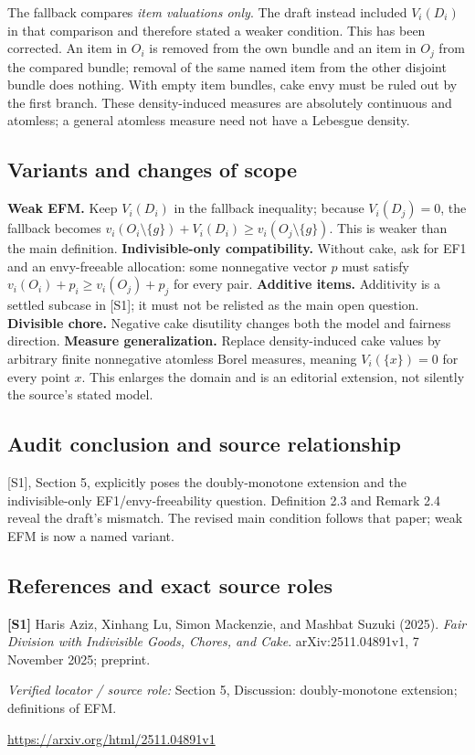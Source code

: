 \documentclass[11pt,a4paper]{article}
\begin{document}
The fallback compares \emph{item valuations only}. The draft instead included $V_i(D_i)$ in that comparison and therefore stated a weaker condition. This has been corrected. An item in $O_i$ is removed from the own bundle and an item in $O_j$ from the compared bundle; removal of the same named item from the other disjoint bundle does nothing. With empty item bundles, cake envy must be ruled out by the first branch. These density-induced measures are absolutely continuous and atomless; a general atomless measure need not have a Lebesgue density.

\subsection*{Variants and changes of scope}

\textbf{Weak EFM.} Keep $V_i(D_i)$ in the fallback inequality; because $V_i(D_j)=0$, the fallback becomes $v_i(O_i\setminus\{g\})+V_i(D_i)\geq v_i(O_j\setminus\{g\})$. This is weaker than the main definition. \textbf{Indivisible-only compatibility.} Without cake, ask for EF1 and an envy-freeable allocation: some nonnegative vector $p$ must satisfy $v_i(O_i)+p_i\geq v_i(O_j)+p_j$ for every pair. \textbf{Additive items.} Additivity is a settled subcase in [S1]; it must not be relisted as the main open question. \textbf{Divisible chore.} Negative cake disutility changes both the model and fairness direction. \textbf{Measure generalization.} Replace density-induced cake values by arbitrary finite nonnegative atomless Borel measures, meaning $V_i(\{x\})=0$ for every point $x$. This enlarges the domain and is an editorial extension, not silently the source's stated model.

\subsection*{Audit conclusion and source relationship}

[S1], Section 5, explicitly poses the doubly-monotone extension and the indivisible-only EF1/envy-freeability question. Definition 2.3 and Remark 2.4 reveal the draft's mismatch. The revised main condition follows that paper; weak EFM is now a named variant.

\subsection*{References and exact source roles}

{\footnotesize\raggedright
\par\noindent\textbf{[S1]} Haris Aziz, Xinhang Lu, Simon Mackenzie, and Mashbat Suzuki (2025). \emph{Fair Division with Indivisible Goods, Chores, and Cake}. arXiv:2511.04891v1, 7 November 2025; preprint.\par \textit{Verified locator / source role:} Section 5, Discussion: doubly-monotone extension; definitions of EFM.\par \url{https://arxiv.org/html/2511.04891v1}\par\smallskip
}
\end{document}
